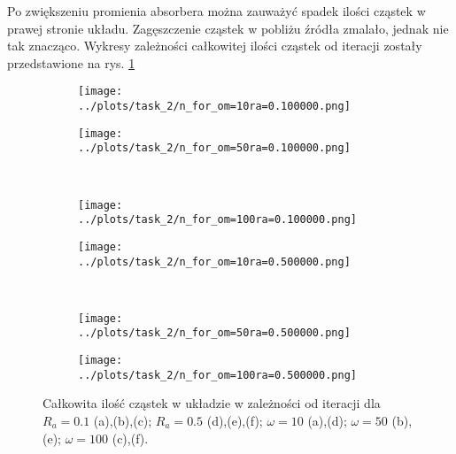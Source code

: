 \documentclass[a4paper, 12pt]{article}
\begin{document}
 \noaka Po zwiększeniu promienia absorbera można zauważyć spadek ilości cząstek w prawej stronie układu. Zagęszczenie cząstek w pobliżu źródła zmalało, jednak nie tak znacząco. Wykresy zależności całkowitej ilości cząstek od iteracji zostały przedstawione na rys. \ref{n_od_it}
 
\begin{figure}[H]
	\centering
	\begin{subfigure}{0.4\textwidth}
		\centering
		\texttt{[image: ../plots/task\_2/n\_for\_om=10ra=0.100000.png]}
		\caption{}
	\end{subfigure}
	\begin{subfigure}{0.4\textwidth}
		\centering
		\texttt{[image: ../plots/task\_2/n\_for\_om=50ra=0.100000.png]}
		\caption{}
	\end{subfigure}
	\\
	\begin{subfigure}{0.4\textwidth}
		\centering
		\texttt{[image: ../plots/task\_2/n\_for\_om=100ra=0.100000.png]}
		\caption{}
	\end{subfigure}
	\begin{subfigure}{0.4\textwidth}
		\centering
		\texttt{[image: ../plots/task\_2/n\_for\_om=10ra=0.500000.png]}
		\caption{}
	\end{subfigure}
	\\
	\begin{subfigure}{0.4\textwidth}
		\centering
		\texttt{[image: ../plots/task\_2/n\_for\_om=50ra=0.500000.png]}
		\caption{}
	\end{subfigure}
	\begin{subfigure}{0.4\textwidth}
		\centering
		\texttt{[image: ../plots/task\_2/n\_for\_om=100ra=0.500000.png]}
		\caption{}
	\end{subfigure}
	\caption{Całkowita ilość cząstek w układzie w zależności od iteracji dla $R_a = 0.1$ (a),(b),(c); $R_a = 0.5$ (d),(e),(f); $\omega = 10$ (a),(d); $\omega = 50$ (b),(e); $\omega = 100$ (c),(f).}
	\label{n_od_it}
\end{figure}
\end{document}
